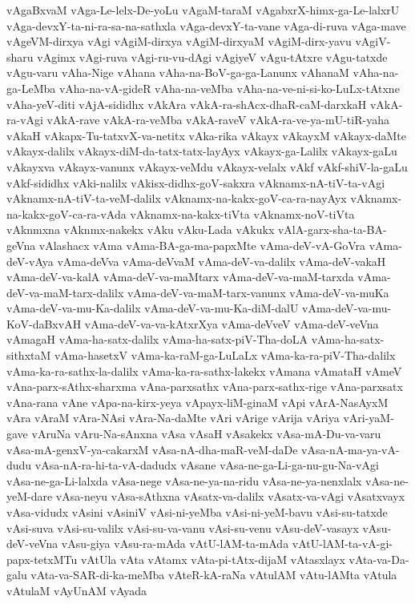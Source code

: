 {vAgaBxvaM
vAga-Le-lelx-De-yoLu
vAgaM-taraM
vAgabxrX-himx-ga-Le-lalxrU
vAga-devxY-ta-ni-ra-sa-na-sathxla
vAga-devxY-ta-vane
vAga-di-ruva
vAga-mave
vAgeVM-dirxya
vAgi
vAgiM-dirxya
vAgiM-dirxyaM
vAgiM-dirx-yavu
vAgiV-sharu
vAgimx
vAgi-ruva
vAgi-ru-vu-dAgi
vAgiyeV
vAgu-tAtxre
vAgu-tatxde
vAgu-varu
vAha-Nige
vAhana
vAha-na-BoV-ga-ga-Lanunx
vAhanaM
vAha-na-ga-LeMba
vAha-na-vA-gideR
vAha-na-veMba
vAha-na-ve-ni-si-ko-LuLx-tAtxne
vAha-yeV-diti
vAjA-sididhx
vAkAra
vAkA-ra-shAcx-dhaR-caM-darxkaH
vAkA-ra-vAgi
vAkA-rave
vAkA-ra-veMba
vAkA-raveV
vAkA-ra-ve-ya-mU-tiR-yaha
vAkaH
vAkapx-Tu-tatxvX-va-netitx
vAka-rika
vAkayx
vAkayxM
vAkayx-daMte
vAkayx-dalilx
vAkayx-diM-da-tatx-tatx-layAyx
vAkayx-ga-Lalilx
vAkayx-gaLu
vAkayxva
vAkayx-vanunx
vAkayx-veMdu
vAkayx-velalx
vAkf
vAkf-shiV-la-gaLu
vAkf-sididhx
vAki-nalilx
vAkisx-didhx-goV-sakxra
vAknamx-nA-tiV-ta-vAgi
vAknamx-nA-tiV-ta-veM-dalilx
vAknamx-na-kakx-goV-ca-ra-nayAyx
vAknamx-na-kakx-goV-ca-ra-vAda
vAknamx-na-kakx-tiVta
vAknamx-noV-tiVta
vAknmxna
vAknmx-nakekx
vAku
vAku-Lada
vAkukx
vAlA-garx-sha-ta-BA-geVna
vAlashacx
vAma
vAma-BA-ga-ma-papxMte
vAma-deV-vA-GoVra
vAma-deV-vAya
vAma-deVva
vAma-deVvaM
vAma-deV-va-dalilx
vAma-deV-vakaH
vAma-deV-va-kalA
vAma-deV-va-maMtarx
vAma-deV-va-maM-tarxda
vAma-deV-va-maM-tarx-dalilx
vAma-deV-va-maM-tarx-vanunx
vAma-deV-va-muKa
vAma-deV-va-mu-Ka-dalilx
vAma-deV-va-mu-Ka-diM-dalU
vAma-deV-va-mu-KoV-daBxvAH
vAma-deV-va-va-kAtxrXya
vAma-deVveV
vAma-deV-veVna
vAmagaH
vAma-ha-satx-dalilx
vAma-ha-satx-piV-Tha-doLA
vAma-ha-satx-sithxtaM
vAma-hasetxV
vAma-ka-raM-ga-LuLaLx
vAma-ka-ra-piV-Tha-dalilx
vAma-ka-ra-sathx-la-dalilx
vAma-ka-ra-sathx-lakekx
vAmana
vAmataH
vAmeV
vAna-parx-sAthx-sharxma
vAna-parxsathx
vAna-parx-sathx-rige
vAna-parxsatx
vAna-rana
vAne
vApa-na-kirx-yeya
vApayx-liM-ginaM
vApi
vArA-NasAyxM
vAra
vAraM
vAra-NAsi
vAra-Na-daMte
vAri
vArige
vArija
vAriya
vAri-yaM-gave
vAruNa
vAru-Na-sAnxna
vAsa
vAsaH
vAsakekx
vAsa-mA-Du-va-varu
vAsa-mA-genxV-ya-cakarxM
vAsa-nA-dha-maR-veM-daDe
vAsa-nA-ma-ya-vA-dudu
vAsa-nA-ra-hi-ta-vA-dadudx
vAsane
vAsa-ne-ga-Li-ga-nu-gu-Na-vAgi
vAsa-ne-ga-Li-lalxda
vAsa-nege
vAsa-ne-ya-na-ridu
vAsa-ne-ya-nenxlalx
vAsa-ne-yeM-dare
vAsa-neyu
vAsa-sAthxna
vAsatx-va-dalilx
vAsatx-va-vAgi
vAsatxvayx
vAsa-vidudx
vAsini
vAsiniV
vAsi-ni-yeMba
vAsi-ni-yeM-bavu
vAsi-su-tatxde
vAsi-suva
vAsi-su-valilx
vAsi-su-va-vanu
vAsi-su-venu
vAsu-deV-vasayx
vAsu-deV-veVna
vAsu-giya
vAsu-ra-mAda
vAtU-lAM-ta-mAda
vAtU-lAM-ta-vA-gi-papx-tetxMTu
vAtUla
vAta
vAtamx
vAta-pi-tAtx-dijaM
vAtasxlayx
vAta-va-Da-galu
vAta-va-SAR-di-ka-meMba
vAteR-kA-raNa
vAtulAM
vAtu-lAMta
vAtula
vAtulaM
vAyUnAM
vAyada
}
